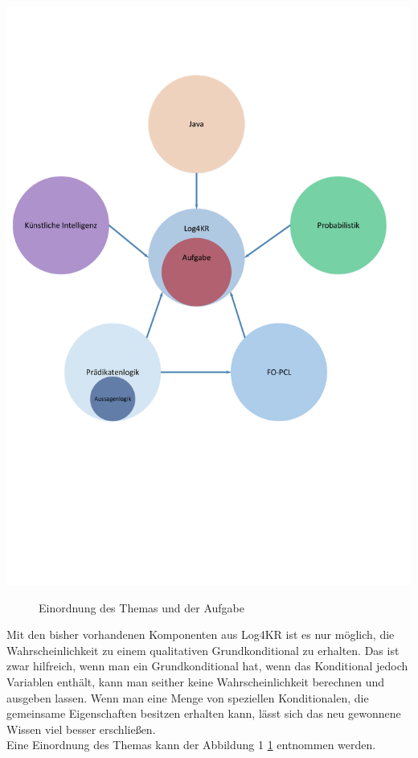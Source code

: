 \documentclass[a4paper, 11pt]{book}
\begin{document}
\includegraphics[scale = 0.3]{Graphics/Eingangsbild}
\begin{figure}[h]
	\caption{Einordnung des Themas und der Aufgabe}
	\label{Eingangsgrafik}
\end{figure}
\newpage

Mit den bisher vorhandenen Komponenten aus Log4KR ist es nur möglich, die Wahrscheinlichkeit zu einem qualitativen Grundkonditional zu erhalten. Das ist zwar hilfreich, wenn man ein Grundkonditional hat, wenn das Konditional jedoch Variablen enthält, kann man seither keine Wahrscheinlichkeit berechnen und ausgeben lassen.
Wenn man eine Menge von speziellen Konditionalen, die gemeinsame Eigenschaften besitzen erhalten kann, lässt sich das neu gewonnene Wissen viel besser erschließen. \\
Eine Einordnung des Themas kann der Abbildung 1 \ref{Eingangsgrafik} entnommen werden.
\end{document}
